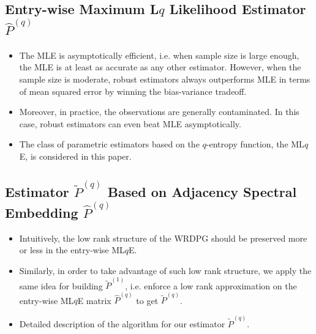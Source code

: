 \documentclass[a4paper]{article}
\begin{document}
\subsection{Entry-wise Maximum L$q$ Likelihood Estimator $\hat{P}^{(q)}$}
\begin{itemize}
\item The MLE is asymptotically efficient, i.e. when sample size is large enough, the MLE is at least as accurate as any other estimator. However, when the sample size is moderate, robust estimators always outperforms MLE in terms of mean squared error by winning the bias-variance tradeoff.
\item Moreover, in practice, the observations are generally contaminated. In this case, robust estimators can even beat MLE asymptotically.
\item The class of parametric estimators based on the $q$-entropy function, the ML$q$E, is considered in this paper.
\end{itemize}


\subsection{Estimator $\widetilde{P}^{(q)}$ Based on Adjacency Spectral Embedding $\hat{P}^{(q)}$}
\begin{itemize}
\item Intuitively, the low rank structure of the WRDPG should be preserved more or less in the entry-wise ML$q$E.
\item Similarly, in order to take advantage of such low rank structure, we apply the same idea for building $\widetilde{P}^{(1)}$, i.e. enforce a low rank approximation on the entry-wise ML$q$E matrix $\hat{P}^{(q)}$ to get $\widetilde{P}^{(q)}$.
\item Detailed description of the algorithm for our estimator $\widetilde{P}^{(q)}$.
\end{itemize}


\end{document}
